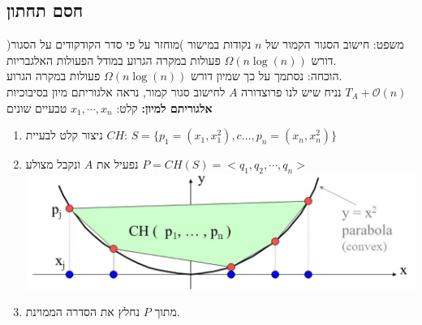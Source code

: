 \documentclass{article}
\makeatletter
\newcommand*{\saved@uline}{}
\let\saved@uline\uline
\newcommand*{\mathuline}{%
  \mathpalette{\math@uline\saved@uline}%
}
\newcommand*{\math@uline}[3]{%
  \mbox{#1{$#2#3\m@th$}}%
}
\renewcommand*{\uline}{%
  \relax  
  \ifmmode
    \expandafter\mathuline
  \else
    \expandafter\saved@uline
  \fi
}
\makeatother
\begin{document}
\subsection{חסם תחתון}
\uline{משפט:} חישוב הסגור הקמור של $n$ נקודות במישור )מוחזר על פי סדר הקודקודים על הסגור( דורש $\Omega(n \log(n))$ פעולות במקרה הגרוע במודל הפעולות האלגבריות.\\
\uline{הוכחה:} נסתמך על כך שמיון דורש $\Omega(n \log(n))$ פעולות במקרה הגרוע.\\
נניח שיש לנו פרוצדורה $A$ לחישוב סגור קמור, נראה אלגוריתם מיון בסיבוכיות $T_A+\mathcal{O}(n)$\\
\textbf{אלגוריתם למיון:}
\uline{קלט:} $x_1, \cdots, x_n$ טבעיים שונים\\
\begin{enumerate}
\item ניצור קלט לבעיית $CH$: $S=\{ p_1=(x_1, x_1^2), c\dots, p_n=(x_n, x_n^2) \}$
\item נפעיל את $A$ ונקבל מצולע $P=CH(S)= <q_1, q_2, \cdots, q_n>$\\
\includegraphics[scale=0.2]{z4.png}
\\
\item מתוך $P$ נחלץ את הסדרה הממוינת.
\end{enumerate}
\end{document}
